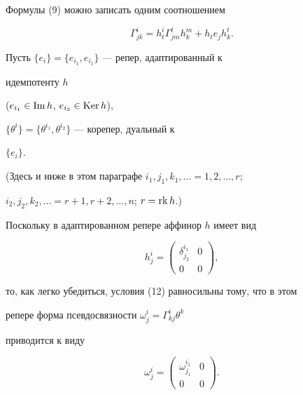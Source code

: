 Формулы (9) можно записать одним соотношением


\begin{equation}


\Gamma^i_{jk}=h^i_t\Gamma^t_{jm}h^m_k+h_t e_j h^t_k.


\end{equation}


Пусть $\{e_i\}=\{e_{i_1},e_{i_1}\}$ --- репер, адаптированный к


идемпотенту $h$


($e_{i_1}\in\operatorname{Im} h$, $e_{i_2}\in\operatorname{Ker} h$),


$\{\theta^i\}=\{\theta^{i_1},\theta^{i_2}\}$ --- корепер, дуальный к


$\{e_i\}$.


(Здесь и ниже в этом параграфе $i_1,j_1,k_1,\dotsc=1,2,\dotsc,r$;


$i_2,j_2,k_2,\dotsc=r+1,r+2,\dotsc,n$; $r=\operatorname{rk} h$.)


Поскольку в адаптированном репере аффинор $h$ имеет вид


\begin{equation}


h^i_j=\left(


\begin{array}{c|c}


\delta^{i_1}_{j_2} & 0 \\[1mm]


\hline


0 & 0


\end{array}


\right)


,


\end{equation}


то, как легко убедиться, условия (12) равносильны тому, что в этом


репере форма псевдосвязности $\omega^i_j=\Gamma^i_{kj}\theta^k$


приводится к виду


\begin{equation}


\omega^i_j=\left(


\begin{array}{c|c}


\omega^{i_1}_{j_1} & 0 \\[1mm]


\hline


0 & 0


\end{array}


\right)


.


\end{equation}





